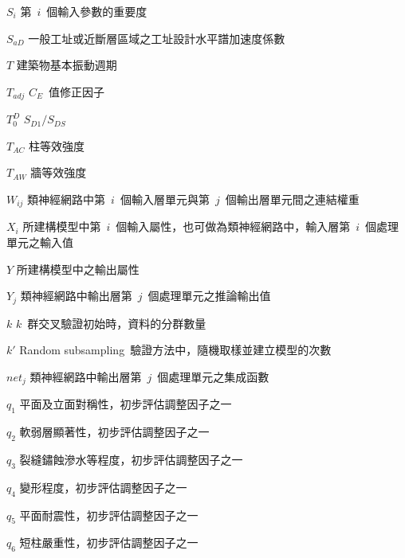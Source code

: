 \begin{SymEntry}
\item[$S_i$]
第~$i$~個輸入參數的重要度

\item[$S_{aD}$]
一般工址或近斷層區域之工址設計水平譜加速度係數

\item[$T$]
建築物基本振動週期

\item[$T_{adj}$]
$C_E$~值修正因子

\item[$T_0^D$]
$S_{D1}/S_{DS}$

\item[$T_{AC}$]
柱等效強度

\item[$T_{AW}$]
牆等效強度

\item[$W_{ij}$]
類神經網路中第~$i$~個輸入層單元與第~$j$~個輸出層單元間之連結權重

\item[$X_i$]
所建構模型中第~$i$~個輸入屬性，也可做為類神經網路中，輸入層第~$i$~個處理單元之輸入值

\item[$Y$]
所建構模型中之輸出屬性

\item[$Y_j$]
類神經網路中輸出層第~$j$~個處理單元之推論輸出值

\item[$k$]
$k$~群交叉驗證初始時，資料的分群數量

\item[$k'$]
Random subsampling~驗證方法中，隨機取樣並建立模型的次數

\item[$net_j$]
類神經網路中輸出層第~$j$~個處理單元之集成函數

\item[$q_1$]
平面及立面對稱性，初步評估調整因子之一

\item[$q_2$]
軟弱層顯著性，初步評估調整因子之一

\item[$q_3$]
裂縫鏽蝕滲水等程度，初步評估調整因子之一

\item[$q_4$]
變形程度，初步評估調整因子之一

\item[$q_5$]
平面耐震性，初步評估調整因子之一

\item[$q_6$]
短柱嚴重性，初步評估調整因子之一


\end{SymEntry}
